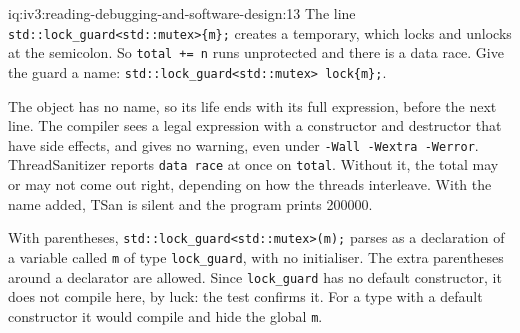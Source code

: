 \begin{solution}{iq:iv3:reading-debugging-and-software-design:13}
The line \texttt{std::lock\_guard<std::mutex>\{m\};} creates a temporary, which locks and unlocks at the semicolon. So \texttt{total += n} runs unprotected and there is a data race. Give the guard a name: \texttt{std::lock\_guard<std::mutex> lock\{m\};}.

The object has no name, so its life ends with its full expression, before the next line. The compiler sees a legal expression with a constructor and destructor that have side effects, and gives no warning, even under \texttt{-Wall -Wextra -Werror}. ThreadSanitizer reports \texttt{data race} at once on \texttt{total}. Without it, the total may or may not come out right, depending on how the threads interleave. With the name added, TSan is silent and the program prints 200000.

With parentheses, \texttt{std::lock\_guard<std::mutex>(m);} parses as a declaration of a variable called \texttt{m} of type \texttt{lock\_guard}, with no initialiser. The extra parentheses around a declarator are allowed. Since \texttt{lock\_guard} has no default constructor, it does not compile here, by luck: the test confirms it. For a type with a default constructor it would compile and hide the global \texttt{m}.


\end{solution}

